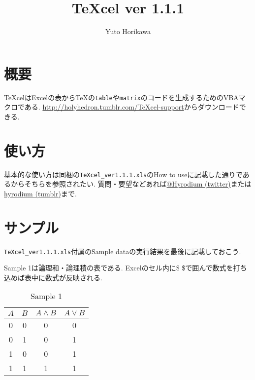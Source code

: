 \documentclass{jsarticle}
\title{TeXcel ver 1.1.1}
\author{Yuto Horikawa}
\begin{document}
\maketitle
\vspace{-3zw}
\section{概要}
TeXcelはExcelの表から\TeX の\verb|table|や\verb|matrix|のコードを生成するためのVBAマクロである.
\url{http://holyhedron.tumblr.com/TeXcel-support}からダウンロードできる.

\section{使い方}
基本的な使い方は同梱の\verb|TeXcel_ver1.1.1.xls|のHow to useに記載した通りであるからそちらを参照されたい.
質問・要望などあれば\href{https://twitter.com/Hyrodium}{@Hyrodium (twitter)}または\href{http://hyrodium.tumblr.com/}{hyrodium (tumblr)}まで.

\section{サンプル}
\verb|TeXcel_ver1.1.1.xls|付属のSample dataの実行結果を最後に記載しておこう.

Sample 1は論理和・論理積の表である.
Excelのセル内に\$ \$で囲んで数式を打ち込めば表中に数式が反映される.
\vspace{-0.5em}
\begin{table}[htb]
	\captionsetup{labelformat=empty,labelsep=none}
	\caption{Sample 1}
	\label{sample1}
	\centering
	\begin{tabular}{|c|c|c|c|}\hline
		$A$	&$B$	&$A\land B$	&$A\lor B$	\\ \hline
		0	&0	&0	&0	\\ \hline
		0	&1	&0	&1	\\ \hline
		1	&0	&0	&1	\\ \hline
		1	&1	&1	&1	\\ \hline
	\end{tabular}
\end{table}
\end{document}
